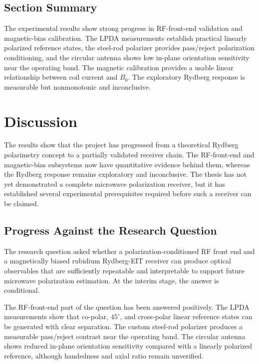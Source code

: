 \documentclass{ieeeaccess}
\begin{document}
\subsection{Section Summary}
\label{subsec:results_summary}

The experimental results show strong progress in RF-front-end validation and magnetic-bias calibration. The LPDA measurements establish practical linearly polarized reference states, the steel-rod polarizer provides pass/reject polarization conditioning, and the circular antenna shows low in-plane orientation sensitivity near the operating band. The magnetic calibration provides a usable linear relationship between coil current and \(B_0\). The exploratory Rydberg response is measurable but nonmonotonic and inconclusive.

\section{Discussion}
\label{sec:discussion}

The results show that the project has progressed from a theoretical Rydberg polarimetry concept to a partially validated receiver chain. The RF-front-end and magnetic-bias subsystems now have quantitative evidence behind them, whereas the Rydberg response remains exploratory and inconclusive. The thesis has not yet demonstrated a complete microwave polarization receiver, but it has established several experimental prerequisites required before such a receiver can be claimed.

\subsection{Progress Against the Research Question}
\label{subsec:discussion_research_question}

The research question asked whether a polarization-conditioned RF front end and a magnetically biased rubidium Rydberg-EIT receiver can produce optical observables that are sufficiently repeatable and interpretable to support future microwave polarization estimation. At the interim stage, the answer is conditional.

The RF-front-end part of the question has been answered positively. The LPDA measurements show that co-polar, \(45^\circ\), and cross-polar linear reference states can be generated with clear separation. The custom steel-rod polarizer produces a measurable pass/reject contrast near the operating band. The circular antenna shows reduced in-plane orientation sensitivity compared with a linearly polarized reference, although handedness and axial ratio remain unverified.
\end{document}
